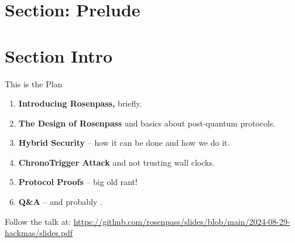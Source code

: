 \section{Section: Prelude}

\section{Section Intro}

\begin{frame}[s]{This is the Plan}
  \small
  \begin{enumerate}
    \item \textbf{Introducing Rosenpass,} briefly.
    \item \textbf{The Design of Rosenpass} and basics about post-quantum protocols.
    \item \textbf{Hybrid Security} – how it can be done and how we do it.
    \item \textbf{ChronoTrigger Attack} and not trusting wall clocks.
    \item \textbf{Protocol Proofs} – big old rant!
    \item \textbf{Q\&A} – and probably .
  \end{enumerate}

  \vspace{.7em}

  \begin{minipage}{.6\textwidth - 1.2cm}
    \raggedright
    \footnotesize
    Follow the talk at: \href{github.com/rosenpass/slides/blob/main/2024-08-29-hackmas/slides.pdf}{https://github.com/rosenpass/slides/blob/main/2024-08-29-hackmas/slides.pdf}
  \end{minipage}
\end{frame}



